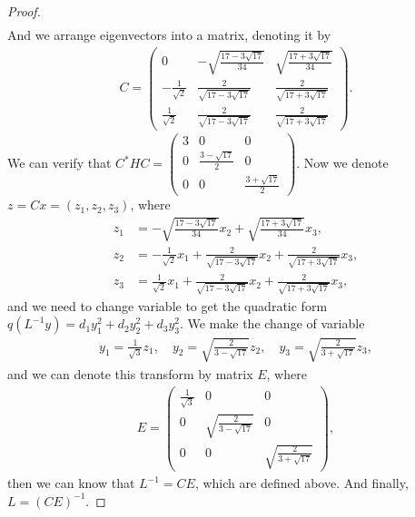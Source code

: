 \documentclass[11pt]{book}
\theoremstyle{definition}
\numberwithin{equation}{chapter}
\begin{document}
\begin{proof}
\begin{align*}
\end{align*}
And we arrange eigenvectors into a matrix, denoting it by 
\begin{align*}
    C = \left(\begin{matrix}
    0 & -\sqrt{\frac{17-3\sqrt{17}}{34}} & \sqrt{\frac{17+3\sqrt{17}}{34}} \\
    - \frac{1}{\sqrt{2}} & \frac{2}{\sqrt{17-3\sqrt{17}}} & \frac{2}{\sqrt{17+3\sqrt{17}}} \\
    \frac{1}{\sqrt{2}} & \frac{2}{\sqrt{17-3\sqrt{17}}} & \frac{2}{\sqrt{17+3\sqrt{17}}}
    \end{matrix}\right).
\end{align*}
We can verify that $C^*HC = \left(
\begin{matrix}
3 & 0 & 0\\
0 & \frac{3-\sqrt{17}}{2} & 0\\
0 & 0 & \frac{3+\sqrt{17}}{2}
\end{matrix}
\right)$. Now we denote $z = Cx = (z_1, z_2, z_3)$, where 
\begin{align*}
    z_1 & = -\sqrt{\frac{17-3\sqrt{17}}{34}}x_2 + \sqrt{\frac{17+3\sqrt{17}}{34}}x_3,\\
    z_2 & = - \frac{1}{\sqrt{2}}x_1 + \frac{2}{\sqrt{17-3\sqrt{17}}}x_2 + \frac{2}{\sqrt{17+3\sqrt{17}}}x_3, \\
    z_3 & = \frac{1}{\sqrt{2}}x_1 + \frac{2}{\sqrt{17-3\sqrt{17}}}x_2 + \frac{2}{\sqrt{17+3\sqrt{17}}}x_3,
\end{align*}
and we need to change variable to get the quadratic form $q\left(  L^{-1}y\right)  =d_{1}y_{1}^{2}+d_{2}y_{2}^{2}+d_{3}y_{3}^{2}$. We make the change of variable
\begin{align*}
    y_1 = \frac{1}{\sqrt{3}}z_1,\quad y_2 = \sqrt{\frac{2}{3-\sqrt{17}}} z_2,\quad y_3  = \sqrt{\frac{2}{3+\sqrt{17}}} z_3,
\end{align*}
and we can denote this transform by matrix $E$, where 
\begin{align*}
    E = \left(
    \begin{matrix}
    \frac{1}{\sqrt{3}} & 0 & 0\\
    0 & \sqrt{\frac{2}{3-\sqrt{17}}} & 0\\
    0 & 0 & \sqrt{\frac{2}{3+\sqrt{17}}}
    \end{matrix}
    \right),
\end{align*}
then we can know that $L^{-1} = CE$, which are defined above. And finally, $L = (CE)^{-1}$.
\end{proof}
\end{document}
